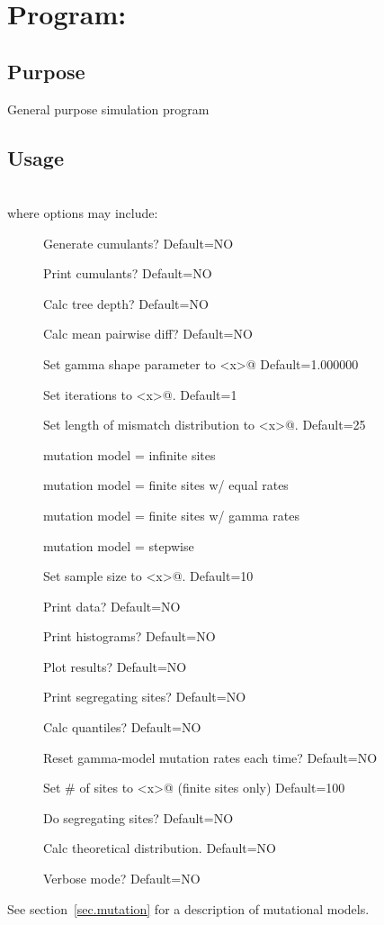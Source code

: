 \chapter{Program: \label{ch.mmgen}}

\section{Purpose} General purpose simulation program

\section{Usage\label{sec.mmgen.usage}} \\
where options may include:
\begin{description}
\item[]    Generate cumulants? Default=NO
\item[]    Print cumulants? Default=NO
\item[]    Calc tree depth? Default=NO
\item[]    Calc mean pairwise diff? Default=NO
\item[] Set gamma shape parameter to \verb@<x>@
      Default=1.000000 
\item[] Set iterations to \verb@<x>@. Default=1
\item[] Set length of mismatch distribution to
      \verb@<x>@. Default=25 
\item[]   mutation model = infinite sites
\item[]   mutation model = finite sites w/ equal rates
\item[]   mutation model = finite sites w/ gamma rates
\item[]   mutation model = stepwise
\item[] Set sample size to \verb@<x>@. Default=10
\item[]   Print data? Default=NO
\item[]   Print histograms? Default=NO
\item[]   Plot results? Default=NO
\item[]   Print segregating sites? Default=NO
\item[]    Calc quantiles? Default=NO
\item[]    Reset gamma-model mutation rates each time? Default=NO
\item[] Set \# of sites to \verb@<x>@ (finite sites only)
      Default=100 
\item[]    Do segregating sites? Default=NO
\item[]    Calc theoretical distribution. Default=NO
\item[]    Verbose mode?  Default=NO
\end{description}
See section~\ref{sec.mutation} for a description of mutational models.

